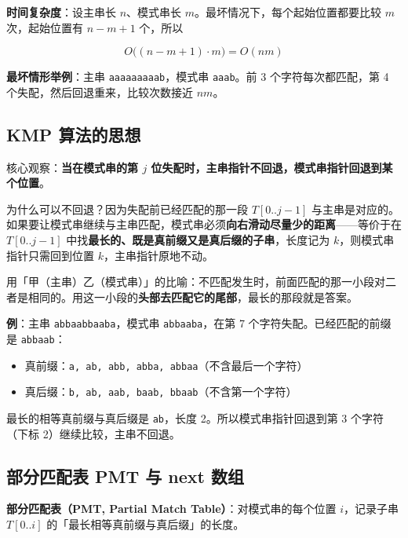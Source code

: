 \documentclass[11pt,openany,UTF8]{ctexbook}
\begin{document}
\textbf{时间复杂度}：设主串长 $n$、模式串长 $m$。最坏情况下，每个起始位置都要比较 $m$ 次，起始位置有 $n-m+1$ 个，所以

\[O\big((n-m+1)\cdot m\big)=O(nm)\]

\textbf{最坏情形举例}：主串 \texttt{aaaaaaaaab}，模式串 \texttt{aaab}。前 3 个字符每次都匹配，第 4 个失配，然后回退重来，比较次数接近 $nm$。

\subsection{KMP 算法的思想}

核心观察：\textbf{当在模式串的第 $j$ 位失配时，主串指针不回退，模式串指针回退到某个位置}。

为什么可以不回退？因为失配前已经匹配的那一段 $T[0..j-1]$ 与主串是对应的。如果要让模式串继续与主串匹配，模式串必须\textbf{向右滑动尽量少的距离}——等价于在 $T[0..j-1]$ 中找\textbf{最长的、既是真前缀又是真后缀的子串}，长度记为 $k$，则模式串指针只需回到位置 $k$，主串指针原地不动。

用「甲（主串）乙（模式串）」的比喻：不匹配发生时，前面匹配的那一小段对二者是相同的。用这一小段的\textbf{头部去匹配它的尾部}，最长的那段就是答案。

\textbf{例}：主串 \texttt{abbaabbaaba}，模式串 \texttt{abbaaba}，在第 7 个字符失配。已经匹配的前缀是 \texttt{abbaab}：

\begin{itemize}
\item 真前缀：\texttt{a,\allowbreak{} ab,\allowbreak{} abb,\allowbreak{} abba,\allowbreak{} abbaa}（不含最后一个字符）
\item 真后缀：\texttt{b,\allowbreak{} ab,\allowbreak{} aab,\allowbreak{} baab,\allowbreak{} bbaab}（不含第一个字符）
\end{itemize}
最长的相等真前缀与真后缀是 \texttt{ab}，长度 2。所以模式串指针回退到第 3 个字符（下标 2）继续比较，主串不回退。

\subsection{部分匹配表 PMT 与 next 数组}

\textbf{部分匹配表（PMT, Partial Match Table）}：对模式串的每个位置 $i$，记录子串 $T[0..i]$ 的「最长相等真前缀与真后缀」的长度。
\end{document}
